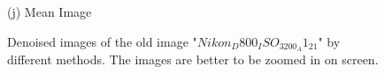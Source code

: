 \documentclass[10pt,twocolumn,letterpaper]{article}
\begin{document}
\begin{figure}
{\begin{minipage}[t]{0.2\textwidth}
{\footnotesize (j) Mean Image }
\end{minipage}
}
\caption{Denoised images of the old image "$Nikon_D800_ISO_3200_A1_21$" by different methods. The images are better to be zoomed in on screen.}
\label{fig2}
\end{figure}


\begin{figure}
\centering
{}
\end{figure}
\end{document}
